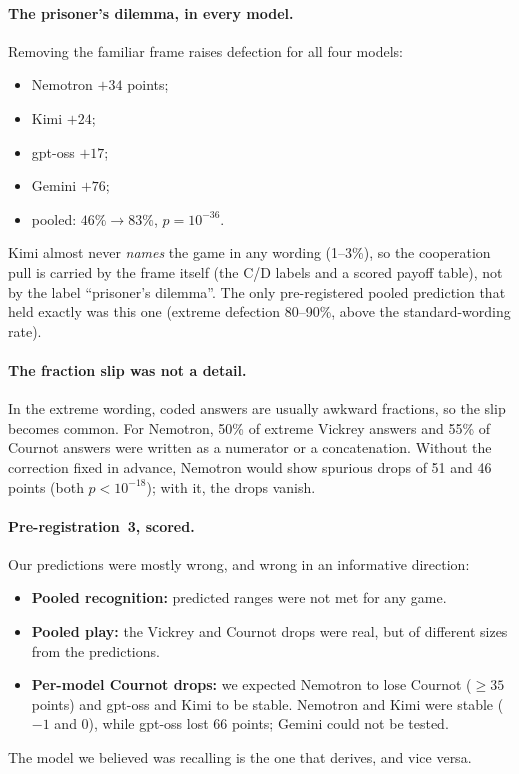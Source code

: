 \documentclass[10pt]{article}
\theoremstyle{definition}
\theoremstyle{remark}
\begin{document}
\paragraph{The prisoner's dilemma, in every model.} Removing the familiar frame raises defection
for all four models:
\begin{itemize}
\item Nemotron $+34$ points;
\item Kimi $+24$;
\item gpt-oss $+17$;
\item Gemini $+76$;
\item pooled: $46\%\to83\%$, $p=10^{-36}$.
\end{itemize}
Kimi almost never \emph{names} the game in any wording (1--3\%), so the cooperation pull is
carried by the frame itself (the C/D labels and a scored payoff table), not by the label
``prisoner's dilemma''. The only pre-registered pooled prediction that held exactly was this one
(extreme defection 80--90\%, above the standard-wording rate).

\paragraph{The fraction slip was not a detail.} In the extreme wording, coded answers are usually
awkward fractions, so the slip becomes common. For Nemotron, 50\% of extreme Vickrey answers and
55\% of Cournot answers were written as a numerator or a concatenation. Without the correction
fixed in advance, Nemotron would show spurious drops of 51 and 46 points (both $p<10^{-18}$);
with it, the drops vanish.

\paragraph{Pre-registration~3, scored.} Our predictions were mostly wrong, and wrong in
an informative direction:
\begin{itemize}
\item \textbf{Pooled recognition:} predicted ranges were not met for any game.
\item \textbf{Pooled play:} the Vickrey and Cournot drops were real, but of different sizes from
  the predictions.
\item \textbf{Per-model Cournot drops:} we expected Nemotron to lose Cournot ($\ge35$
  points) and gpt-oss and Kimi to be stable. Nemotron and Kimi were stable ($-1$ and $0$), while
  gpt-oss lost 66 points; Gemini could not be tested.
\end{itemize}
The model we believed was recalling is the one that derives, and vice versa.
\end{document}
